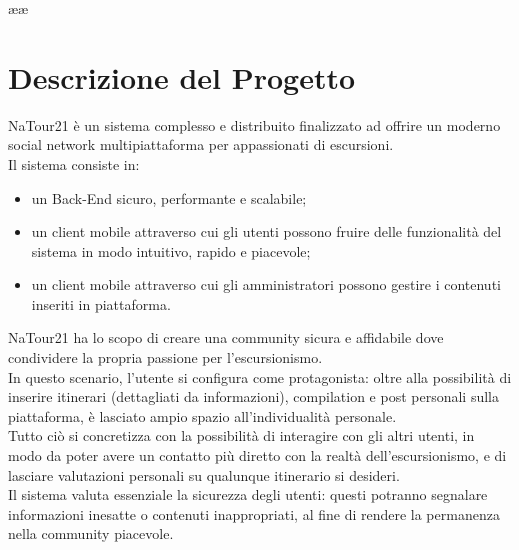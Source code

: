 ææ\documentclass{natourDoc}
\begin{document}

	
	
	
	
	\section{Descrizione del Progetto}
	NaTour21 è un sistema complesso e distribuito finalizzato ad offrire un moderno social network multipiattaforma per appassionati di escursioni.\\
	
	Il sistema consiste in:
	\begin{itemize}
		\item un Back-End sicuro, performante e scalabile;
		\item un client mobile attraverso cui gli
		utenti possono fruire delle funzionalità del sistema in modo intuitivo, rapido e piacevole;
		\item un client mobile attraverso cui gli amministratori possono gestire i contenuti inseriti in piattaforma.\\
	\end{itemize}
	
	NaTour21 ha lo scopo di creare una community sicura e affidabile dove condividere la propria passione per l'escursionismo.\\
	
	In questo scenario, l'utente si configura come protagonista: oltre alla possibilità di inserire itinerari (dettagliati da informazioni), compilation e post personali sulla piattaforma,
	è lasciato ampio spazio all'individualità personale.\\
	
	Tutto ciò si concretizza con la possibilità di interagire con gli altri utenti, in modo da poter avere un contatto più diretto con
	la realtà dell'escursionismo, e di lasciare valutazioni personali su qualunque itinerario si desideri.\\
	
	Il sistema valuta essenziale la sicurezza degli utenti: questi potranno segnalare informazioni inesatte o contenuti inappropriati, al fine 
	di rendere la permanenza nella community piacevole.
	
\end{document}

